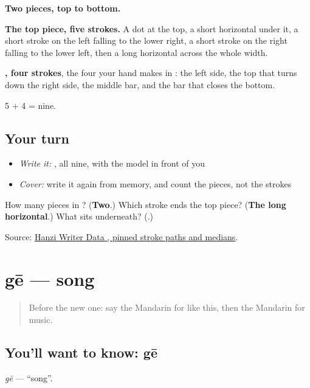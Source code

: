 \begin{quote}
\end{quote}

\textbf{Two pieces, top to bottom.}

\textbf{The top piece, five strokes.} A dot at the top, a short horizontal under it, a short stroke on the left falling to the lower right, a short stroke on the right falling to the lower left, then a long horizontal across the whole width.

\textbf{, four strokes}, the four your hand makes in : the left side, the top that turns down the right side, the middle bar, and the bar that closes the bottom.

5 + 4 = nine.

\subsection*{Your turn}
\begin{itemize}
\raggedright
  \item \emph{Write it:} , all nine, with the model in front of you
  \item \emph{Cover:} write it again from memory, and count the pieces, not the strokes
\end{itemize}

\begin{tcolorbox}[breakable,colback=teal!4,colframe=teal!35!black,title={Before you move on}]
How many pieces in ? (\textbf{Two}.) Which stroke ends the top piece? (\textbf{The long horizontal}.) What sits underneath? (\textbf{}.)

Source: \href{https://raw.githubusercontent.com/chanind/hanzi-writer-data/68d10a4b21150cae5e1ebbd223eed289cf32d90c/data/\%E9\%9F\%B3.json}{Hanzi Writer Data , pinned stroke paths and medians}.
\end{tcolorbox}
\section[gē]{gē — song}

\label{lesson:ZH-C128-ge}



\begin{quote}
Before the new one: say the Mandarin for like this, then the Mandarin for music.
\end{quote}

\subsection*{You'll want to know: gē}
\emph{gē} — \textquotedblleft{}song\textquotedblright{}.

